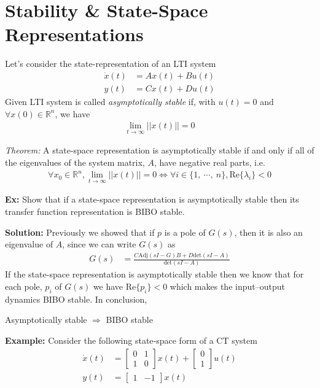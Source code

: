 \documentclass[twoside]{article}
\begin{document}
\newpage

\section{Stability \& State-Space Representations}

Let's consider the state-representation of an LTI system 
%
\begin{align*}
  \dot{x}(t) &= A x(t) + B u(t)
\\
  y(t) &= C x(t) + D u(t)
\end{align*}
%
Given LTI system is called \textit{asymptotically stable} if,
with $u(t) = 0$ and $\forall x(0) \in \mathbb{R}^n$, we have
%
\begin{align*}
  \lim_{t \to \infty} || x(t) || = 0
\end{align*}

\textit{Theorem:} A state-space representation is 
asymptotically stable if and only if all of the eigenvalues
of the system matrix, $A$, have negative real parts, i.e.
%
\begin{align*}
    \forall x_0 \in \mathbb{R}^n, \lim_{t \to \infty} || x(t) || = 0
    \iff \forall i \in \lbrace 1 , \ \cdots ,  \ n \rbrace, \mathrm{Re} \lbrace \lambda_i  \rbrace < 0
\end{align*}
%

\vspace{6pt}

\textbf{Ex:} Show that if a state-space representation is asymptotically stable
then its transfer function representation is BIBO stable.

\vspace{6pt}

\textbf{Solution:} Previously we showed that 
if  $p$ is a pole of $G(s)$, then it is also an
eigenvalue of $A$, since we can write $G(s)$ as 
%
\begin{align*}
 G(s) &= \frac{C \mathrm{Adj} \left(s I - G \right) B + D \mathrm{det}
        \left(s I - A
                               \right)}{\mathrm{det} \left(s I - A
                               \right) }
\end{align*}
%
If the state-space representation is asymptotically stable then
we know that for each pole, $p_i$ of $G(s)$ we have $\mathrm{Re} \lbrace p_i  \rbrace < 0$
which makes the input--output dynamics BIBO stable. In conclusion,

Asymptotically stable $\Rightarrow$ BIBO stable
%

\textbf{Example:} Consider the following state-space form of a
CT system 
%
\begin{align*}
\dot{x}(t) &= 
\left[ \begin{array}{cc} 0 & 1 \\ 1 & 0 \end{array} \right]
x(t)
+
\left[ \begin{array}{c} 0 \\ 1 \end{array} \right] u(t)
\\
y(t) &= \left[ \begin{array}{cc} 1 & -1 \end{array} \right] x(t)
\end{align*}
\end{document}
